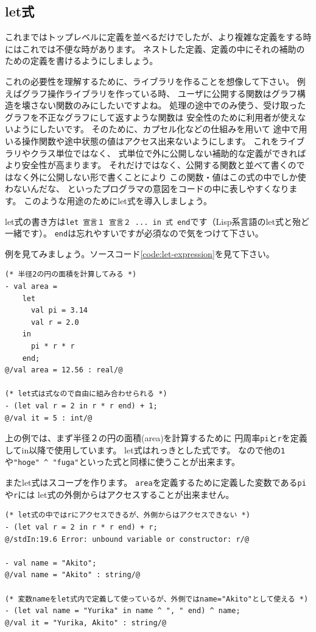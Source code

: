 \documentclass[11pt,a4paper]{article}
\begin{document}
\subsection{let式}
これまではトップレベルに定義を並べるだけでしたが、より複雑な定義をする時にはこれでは不便な時があります。
ネストした定義、定義の中にそれの補助のための定義を書けるようにしましょう。

これの必要性を理解するために、ライブラリを作ることを想像して下さい。
例えばグラフ操作ライブラリを作っている時、
ユーザに公開する関数はグラフ構造を壊さない関数のみにしたいですよね。
処理の途中でのみ使う、受け取ったグラフを不正なグラフにして返すような関数は
安全性のために利用者が使えないようにしたいです。
そのために、カプセル化などの仕組みを用いて
途中で用いる操作関数や途中状態の値はアクセス出来ないようにします。
これをライブラリやクラス単位ではなく、
式単位で外に公開しない補助的な定義ができればより安全性が高まります。
それだけではなく、公開する関数と並べて書くのではなく外に公開しない形で書くことにより
この関数・値はこの式の中でしか使わないんだな、
といったプログラマの意図をコードの中に表しやすくなります。
このような用途のためにlet式を導入しましょう。

let式の書き方は\lstinline{let 宣言１ 宣言２ ... in 式 end}です（Lisp系言語のlet式と殆ど一緒です）。
\lstinline{end}は忘れやすいですが必須なので気をつけて下さい。

例を見てみましょう。ソースコード\ref{code:let-expression}を見て下さい。

\begin{lstlisting}[caption=let式,label=code:let-expression]
(* 半径2の円の面積を計算してみる *)
- val area =
    let
      val pi = 3.14
      val r = 2.0
    in
      pi * r * r
    end;
@/val area = 12.56 : real/@

(* let式は式なので自由に組み合わせられる *)
- (let val r = 2 in r * r end) + 1;
@/val it = 5 : int/@
\end{lstlisting}

上の例では、まず半径２の円の面積(area)を計算するために
円周率\lstinline{pi}と\lstinline{r}を定義してin以降で使用しています。
let式はれっきとした式です。
なので他の\lstinline{1}や\lstinline{"hoge" ^ "fuga"}といった式と同様に使うことが出来ます。

またlet式はスコープを作ります。
\lstinline{area}を定義するために定義した変数である\lstinline{pi}や\lstinline{r}には
let式の外側からはアクセスすることが出来ません。

\begin{lstlisting}[caption=let式のスコープ,label=code:let-scope]
(* let式の中ではrにアクセスできるが、外側からはアクセスできない *)
- (let val r = 2 in r * r end) + r;
@/stdIn:19.6 Error: unbound variable or constructor: r/@

- val name = "Akito";
@/val name = "Akito" : string/@

(* 変数nameをlet式内で定義して使っているが、外側ではname="Akito"として使える *)
- (let val name = "Yurika" in name ^ ", " end) ^ name;
@/val it = "Yurika, Akito" : string/@
\end{lstlisting}
\end{document}
